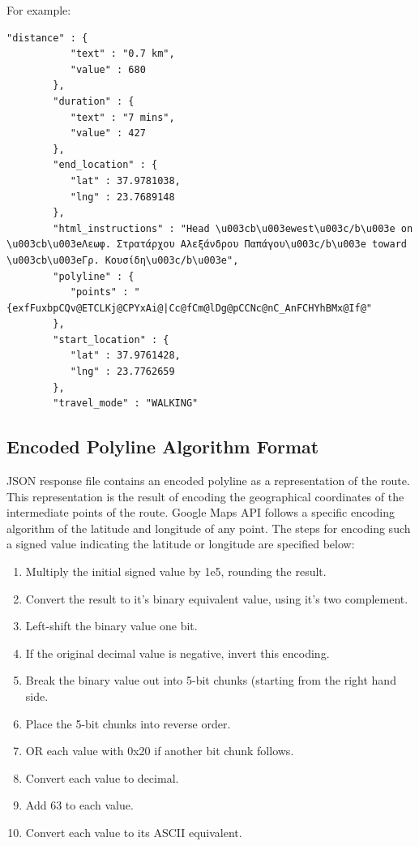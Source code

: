 For example:

\begin{lstlisting}[basicstyle=\footnotesize\ttfamily, breaklines=true]
	"distance" : {
           "text" : "0.7 km",
           "value" : 680
        },
        "duration" : {
           "text" : "7 mins",
           "value" : 427
        },
        "end_location" : {
           "lat" : 37.9781038,
           "lng" : 23.7689148
        },
        "html_instructions" : "Head \u003cb\u003ewest\u003c/b\u003e on \u003cb\u003eΛεωφ. Στρατάρχου Αλεξάνδρου Παπάγου\u003c/b\u003e toward \u003cb\u003eΓρ. Κουσίδη\u003c/b\u003e",
        "polyline" : {
           "points" : "{exfFuxbpCQv@ETCLKj@CPYxAi@|Cc@fCm@lDg@pCCNc@nC_AnFCHYhBMx@If@"
        },
        "start_location" : {
           "lat" : 37.9761428,
           "lng" : 23.7762659
        },
        "travel_mode" : "WALKING"
\end{lstlisting}


\subsection{Encoded Polyline Algorithm Format}

JSON response file contains an encoded polyline as a representation of the route. This representation is the result of encoding 
the geographical coordinates of the intermediate points of the route. Google Maps API follows a specific encoding algorithm \cite{17} of the latitude and longitude 
of any point. The steps for encoding such a signed value indicating the latitude or longitude are specified below:

\begin{enumerate}
 \item Multiply the initial signed value by 1e5, rounding the result.
 \item Convert the result to it's binary equivalent value, using it's two complement. 
 \item Left-shift the binary value one bit.
 \item If the original decimal value is negative, invert this encoding.
 \item Break the binary value out into 5-bit chunks (starting from the right hand side.
 \item Place the 5-bit chunks into reverse order.
 \item OR each value with 0x20 if another bit chunk follows.
 \item Convert each value to decimal.
 \item Add 63 to each value.
 \item Convert each value to its ASCII equivalent.
\end{enumerate}

